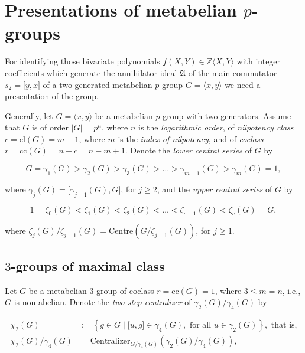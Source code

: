 \documentclass{amsart}
\theoremstyle{definition}
\numberwithin{equation}{section}
\begin{document}
\section{Presentations of metabelian \(p\)-groups}
\label{s:Presentations}

\noindent
For identifying those bivariate polynomials
\(f(X,Y)\in\mathbb{Z}\langle X,Y\rangle\)
with integer coefficients
which generate the annihilator ideal \(\mathfrak{A}\)
of the main commutator \(s_2=\lbrack y,x\rbrack\)
of a two-generated metabelian \(p\)-group \(G=\langle x,y\rangle\)
we need a presentation of the group.


Generally,
let \(G=\langle x,y\rangle\) be a metabelian \(p\)-group with two generators.
Assume that \(G\) is of order \(\lvert G\rvert=p^n\), where \(n\) is the \textit{logarithmic order},
of \textit{nilpotency class} \(c=\mathrm{cl}(G)=m-1\), where \(m\) is the \textit{index of nilpotency},
and of \textit{coclass} \(r=\mathrm{cc}(G)=n-c=n-m+1\).
Denote the \textit{lower central series} of \(G\) by

\begin{equation}
\label{eqn:LowerCentral}
G=\gamma_1(G)>\gamma_2(G)>\gamma_3(G)>\ldots>\gamma_{m-1}(G)>\gamma_m(G)=1,
\end{equation}

\noindent
where \(\gamma_j(G)=\lbrack\gamma_{j-1}(G),G\rbrack\), for \(j\ge 2\),
and the \textit{upper central series} of \(G\) by

\begin{equation}
\label{eqn:UpperCentral}
1=\zeta_0(G)<\zeta_1(G)<\zeta_2(G)<\ldots<\zeta_{c-1}(G)<\zeta_c(G)=G,
\end{equation}

\noindent
where \(\zeta_j(G)/\zeta_{j-1}(G)=\mathrm{Centre}(G/\zeta_{j-1}(G))\), for \(j\ge 1\).



\subsection{\(3\)-groups of maximal class}
\label{ss:MaxClass3}

\noindent
Let \(G\) be a metabelian \(3\)-group of coclass \(r=\mathrm{cc}(G)=1\),
where \(3\le m=n\), i.e., \(G\) is non-abelian.
Denote the \textit{two-step centralizer} of \(\gamma_2(G)/\gamma_4(G)\) by

\begin{equation}
\label{eqn:TwoStepCentralizerMax3}
\begin{aligned}
\chi_2(G)             &:= \left\lbrace g\in G\mid\lbrack u,g\rbrack\in\gamma_4(G), \text{ for all } u\in\gamma_2(G)\right\rbrace, \text{ that is,}\\
\chi_2(G)/\gamma_4(G) &= \mathrm{Centralizer}_{G/\gamma_4(G)}(\gamma_2(G)/\gamma_4(G)),
\end{aligned}
\end{equation}
\end{document}
